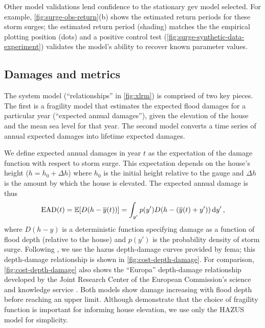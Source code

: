 \documentclass{agujournal2019}
\begin{document}
Other model validations lend confidence to the stationary \gls{gev} model selected.
For example, \cref{fig:surge-obs-return}(b) shows the estimated return periods for these storm surges; the estimated return period  (shading) matches the the empirical plotting position (dots) and a positive control test (\cref{fig:surge-synthetic-data-experiment}) validates the model's ability to recover known parameter values.

\subsection{Damages and metrics}\label{sec:case-metrics}

The system model (``relationships'' in \cref{fig:xlrm}) is comprised of two key pieces.
The first is a fragility model that estimates the expected flood damages for a particular year (``expected annual damages''), given the elevation of the house and the mean sea level for that year.
The second model converts a time series of annual expected damages into lifetime expected damages.

We define expected annual damages in year $t$ as the expectation of the damage function with respect to storm surge.
This expectation depends on the house's height ($h = h_0 + \Delta h$) where $h_0$ is the initial height relative to the gauge and $\Delta h$ is the amount by which the house is elevated.
The expected annual damage is thus
\begin{equation}\label{eq:ead}
  \textrm{EAD}(t) = \mathbb{E}[D \qty(h-\overline{y}(t))] = \int_{y'} p(y') D \qty(h - \qty(\overline{y}(t) + y')) \dd{y'},
\end{equation}
where $D(h-y)$ is a deterministic function specifying damage as a function of flood depth (relative to the house) and $p(y')$ is the probability density of storm surge.
Following , we use the \gls{hazus} depth-damage curves provided by \gls{fema}; this depth-damage relationship is shown in \cref{fig:cost-depth-damage}.
For comparison, \cref{fig:cost-depth-damage} also shows the ``Europa'' depth-damage relationship developed by the Joint Research Center of the European Commission's science and knowledge service \cite{huizinga_depthdamage:2016}.
Both  models show damage increasing with flood depth before reaching an upper limit.
Although  demonstrate that the choice of fragility function is important for informing house elevation, we use only the HAZUS model for simplicity.
\end{document}
